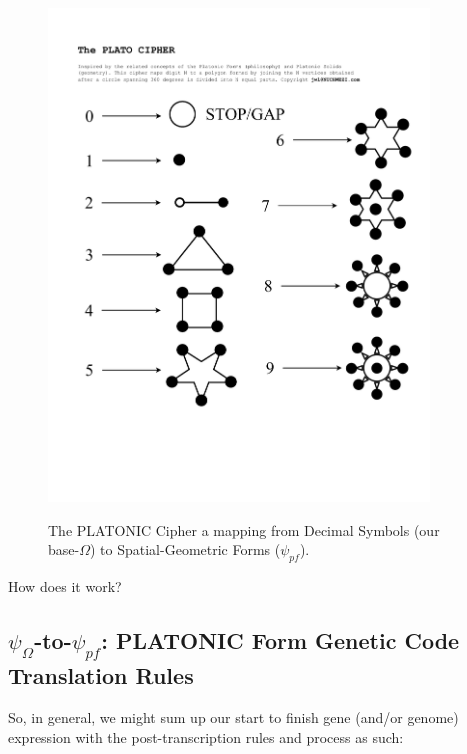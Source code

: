 \documentclass[a4paper, 18pt]{book} %
\begin{document}
\begin{figure}[H]
  \begin{center}
   \includegraphics[trim=0cm 4cm 0cm 0cm, clip, width=0.9\textwidth,]{resources/pdfs/PLATOCIPHER.pdf}\\
   \caption{The PLATONIC Cipher\cite{lutalo_2025_platonic} a mapping from Decimal Symbols (our base-$\Omega$) to Spatial-Geometric Forms ($\psi_{pf}$).}
  \label{FIGPLATONICCIPH}
  \end{center}
\end{figure}


How does it work?

\subsection{$\psi_{\Omega}$-to-$\psi_{pf}$: PLATONIC Form Genetic Code Translation Rules}
\label{SECGENSEQEXPRES}


So, in general, we might sum up our start to finish gene (and/or genome) expression with the post-transcription rules and process as such:
\end{document}
